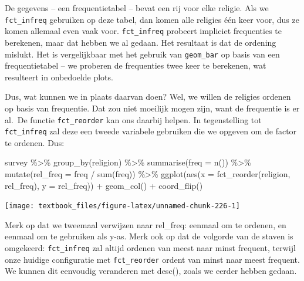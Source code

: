 \documentclass[]{tufte-book}
\newenvironment{Shaded}{}{}
\newcommand{\AttributeTok}[1]{\textcolor[rgb]{0.49,0.56,0.16}{#1}}
\newcommand{\FunctionTok}[1]{\textcolor[rgb]{0.02,0.16,0.49}{#1}}
\newcommand{\NormalTok}[1]{#1}
\newcommand{\SpecialCharTok}[1]{\textcolor[rgb]{0.25,0.44,0.63}{#1}}
\begin{document}
De gegevens -- een frequentietabel -- bevat een rij voor elke religie. Als we \texttt{fct\_infreq} gebruiken op deze tabel, dan komen alle religies één keer voor, dus ze komen allemaal even vaak voor. \texttt{fct\_infreq} probeert impliciet frequenties te berekenen, maar dat hebben we al gedaan. Het resultaat is dat de ordening mislukt. Het is vergelijkbaar met het gebruik van \texttt{geom\_bar} op basis van een frequentietabel -- we proberen de frequenties twee keer te berekenen, wat resulteert in onbedoelde plots.

Dus, wat kunnen we in plaats daarvan doen? Wel, we willen de religies ordenen op basis van frequentie. Dat zou niet moeilijk mogen zijn, want de frequentie is er al.~De functie \texttt{fct\_reorder} kan ons daarbij helpen. In tegenstelling tot \texttt{fct\_infreq} zal deze een tweede variabele gebruiken die we opgeven om de factor te ordenen. Dus:

\begin{Shaded}
\begin{Highlighting}[]
\NormalTok{survey }\SpecialCharTok{\%\textgreater{}\%}
  \FunctionTok{group\_by}\NormalTok{(religion) }\SpecialCharTok{\%\textgreater{}\%}
  \FunctionTok{summarise}\NormalTok{(}\AttributeTok{freq =} \FunctionTok{n}\NormalTok{()) }\SpecialCharTok{\%\textgreater{}\%}
  \FunctionTok{mutate}\NormalTok{(}\AttributeTok{rel\_freq =}\NormalTok{ freq }\SpecialCharTok{/} \FunctionTok{sum}\NormalTok{(freq)) }\SpecialCharTok{\%\textgreater{}\%}
  \FunctionTok{ggplot}\NormalTok{(}\FunctionTok{aes}\NormalTok{(}\AttributeTok{x =} \FunctionTok{fct\_reorder}\NormalTok{(religion, rel\_freq), }\AttributeTok{y =}\NormalTok{ rel\_freq)) }\SpecialCharTok{+}
  \FunctionTok{geom\_col}\NormalTok{() }\SpecialCharTok{+}
  \FunctionTok{coord\_flip}\NormalTok{()}
\end{Highlighting}
\end{Shaded}

\texttt{[image: textbook\_files/figure-latex/unnamed-chunk-226-1]}

Merk op dat we tweemaal verwijzen naar rel\_freq: eenmaal om te ordenen, en eenmaal om te gebruiken als y-as. Merk ook op dat de volgorde van de staven is omgekeerd: \texttt{fct\_infreq} zal altijd ordenen van meest naar minst frequent, terwijl onze huidige configuratie met \texttt{fct\_reorder} ordent van minst naar meest frequent. We kunnen dit eenvoudig veranderen met desc(), zoals we eerder hebben gedaan.
\end{document}
